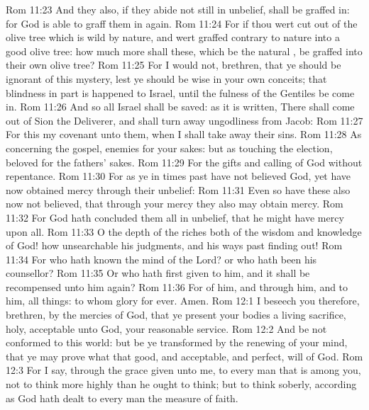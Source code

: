 \vs Rom 11:23 And they also, if they abide not still in unbelief, shall be graffed in: for God is able to graff them in again.
\vs Rom 11:24 For if thou wert cut out of the olive tree which is wild by nature, and wert graffed contrary to nature into a good olive tree: how much more shall these, which be the natural , be graffed into their own olive tree?
\vs Rom 11:25 For I would not, brethren, that ye should be ignorant of this mystery, lest ye should be wise in your own conceits; that blindness in part is happened to Israel, until the fulness of the Gentiles be come in.
\vs Rom 11:26 And so all Israel shall be saved: as it is written, There shall come out of Sion the Deliverer, and shall turn away ungodliness from Jacob:
\vs Rom 11:27 For this  my covenant unto them, when I shall take away their sins.
\vs Rom 11:28 As concerning the gospel,  enemies for your sakes: but as touching the election,  beloved for the fathers' sakes.
\vs Rom 11:29 For the gifts and calling of God  without repentance.
\vs Rom 11:30 For as ye in times past have not believed God, yet have now obtained mercy through their unbelief:
\vs Rom 11:31 Even so have these also now not believed, that through your mercy they also may obtain mercy.
\vs Rom 11:32 For God hath concluded them all in unbelief, that he might have mercy upon all.
\vs Rom 11:33 O the depth of the riches both of the wisdom and knowledge of God! how unsearchable  his judgments, and his ways past finding out!
\vs Rom 11:34 For who hath known the mind of the Lord? or who hath been his counsellor?
\vs Rom 11:35 Or who hath first given to him, and it shall be recompensed unto him again?
\vs Rom 11:36 For of him, and through him, and to him,  all things: to whom  glory for ever. Amen.
\vs Rom 12:1 I beseech you therefore, brethren, by the mercies of God, that ye present your bodies a living sacrifice, holy, acceptable unto God,  your reasonable service.
\vs Rom 12:2 And be not conformed to this world: but be ye transformed by the renewing of your mind, that ye may prove what  that good, and acceptable, and perfect, will of God.
\vs Rom 12:3 For I say, through the grace given unto me, to every man that is among you, not to think  more highly than he ought to think; but to think soberly, according as God hath dealt to every man the measure of faith.
